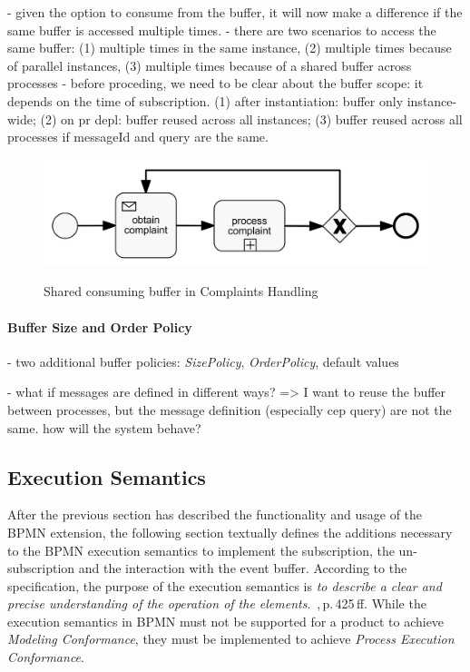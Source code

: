 
- given the option to consume from the buffer, it will now make a difference if the same buffer is accessed multiple times.
- there are two scenarios to access the same buffer: (1) multiple times in the same instance, (2) multiple times because of parallel instances, (3) multiple times because of a shared buffer across processes
- before proceding, we need to be clear about the buffer scope: it depends on the time of subscription. (1) after instantiation: buffer only instance-wide; (2) on pr depl: buffer reused across all instances; (3) buffer reused across all processes if messageId and query are the same.

\begin{figure}[]
	\myfloatalign
	{\includegraphics[width=1\linewidth]{chapters/concept/bpmnx/ComplaintProcessing.png}}
	\caption{Shared consuming buffer in Complaints Handling}\label{fig:example-complaints}
\end{figure}

\paragraph{Buffer Size and Order Policy\newline}

- two additional buffer policies: \textit{SizePolicy}, \textit{OrderPolicy}, default values

- what if messages are defined in different ways? => I want to reuse the buffer between processes, but the message definition (especially cep query) are not the same. how will the system behave?


\subsection{Execution Semantics}\label{bpmnx:executionsemantics}

After the previous section has described the functionality and usage of the BPMN extension, the following section textually defines the additions necessary to the BPMN execution semantics to implement the subscription, the un-subscription and the interaction with the event buffer.
According to the specification, the purpose of the execution semantics is \textit{to describe a clear and precise understanding of the operation of the elements}.~\cite{bpmnspec},\,p.\,425\,ff.
While the execution semantics in BPMN must not be supported for a product to achieve \textit{Modeling Conformance}, they must be implemented to achieve \textit{Process Execution Conformance}.


